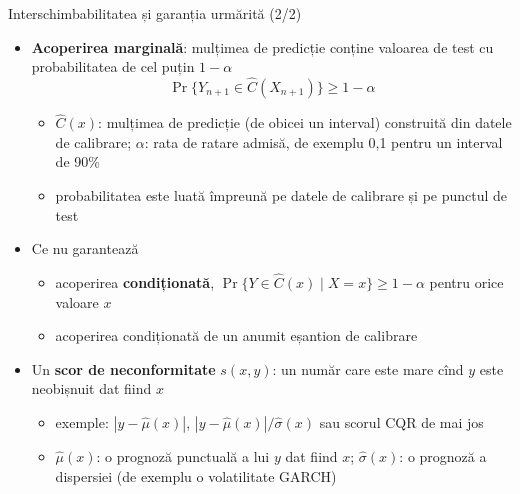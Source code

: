 \begin{frame}{Interschimbabilitatea și garanția urmărită (2/2)}
\itemsize{\small}
\begin{itemize}
    \item \textbf{Acoperirea marginală}: mulțimea de predicție conține valoarea de test cu probabilitatea de cel puțin $1 - \alpha$ \[ \Pr\{Y_{n+1} \in \hat C(X_{n+1})\} \ge 1 - \alpha \]
    \begin{itemize}
        \item $\hat C(x)$: mulțimea de predicție (de obicei un interval) construită din datele de calibrare; $\alpha$: rata de ratare admisă, de exemplu 0,1 pentru un interval de 90\%
        \item probabilitatea este luată împreună pe datele de calibrare și pe punctul de test
    \end{itemize}
    \item Ce nu garantează
    \begin{itemize}
        \item acoperirea \textbf{condiționată}, $\Pr\{Y \in \hat C(x) \mid X = x\} \ge 1 - \alpha$ pentru orice valoare $x$
        \item acoperirea condiționată de un anumit eșantion de calibrare
    \end{itemize}
    \item Un \textbf{scor de neconformitate} $s(x, y)$: un număr care este mare cînd $y$ este neobișnuit dat fiind $x$
    \begin{itemize}
        \item exemple: $|y - \hat\mu(x)|$, $|y - \hat\mu(x)|/\hat\sigma(x)$ sau scorul CQR de mai jos
        \item $\hat\mu(x)$: o prognoză punctuală a lui $y$ dat fiind $x$; $\hat\sigma(x)$: o prognoză a dispersiei (de exemplu o volatilitate GARCH)
    \end{itemize}
\end{itemize}
\end{frame}

